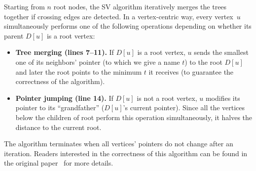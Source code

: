 \documentclass{sokendai_thesis} %
\begin{document}
Starting from $n$ root nodes, the SV algorithm iteratively merges the trees together if crossing edges are detected.
In a vertex-centric way, every vertex~$u$ simultaneously performs one of the following operations depending on whether its parent $D[u]$ is a root vertex:
\begin{itemize}
 \item \textbf{Tree merging (lines 7--11).}
  If $D[u]$ is a root vertex, $u$ sends the smallest one of its neighbors' pointer (to which we give a name $t$) to the root $D[u]$ and later the root points to the minimum $t$ it receives (to guarantee the correctness of the algorithm).
 \item \textbf{Pointer jumping (line 14).}
  If $D[u]$ is not a root vertex, $u$ modifies its pointer to its ``grandfather'' ($D[u]$'s current pointer).
  Since all the vertices below the children of root perform this operation simultaneously, it halves the distance to the current root.
\end{itemize}
The algorithm terminates when all vertices' pointers do not change after an iteration.
Readers interested in the correctness of this algorithm can be found in the original paper~\cite{yan2015effective} for more details.

\end{document}
